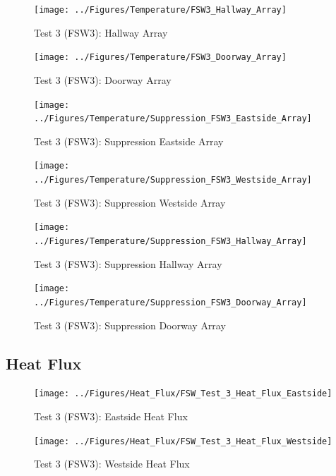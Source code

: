 \documentclass[12pt,oneside]{book}
\begin{document}
\begin{figure}[!ht]
	\texttt{[image: ../Figures/Temperature/FSW3\_Hallway\_Array]}
	\caption{Test 3 (FSW3): Hallway Array}
	\label{fig:Test_3_Hallway_Array}
\end{figure}

\begin{figure}[!ht]
	\texttt{[image: ../Figures/Temperature/FSW3\_Doorway\_Array]}
	\caption{Test 3 (FSW3): Doorway Array}
	\label{fig:Test_3_Doorway_Array}
\end{figure}

\begin{figure}[!ht]
	\texttt{[image: ../Figures/Temperature/Suppression\_FSW3\_Eastside\_Array]}
	\caption{Test 3 (FSW3): Suppression Eastside Array}
	\label{fig:Test_3_Suppression_Eastside_Array}
\end{figure}

\begin{figure}[!ht]
	\texttt{[image: ../Figures/Temperature/Suppression\_FSW3\_Westside\_Array]}
	\caption{Test 3 (FSW3): Suppression Westside Array}
	\label{fig:Test_3_Suppression_Westside_Array}
\end{figure}

\begin{figure}[!ht]
	\texttt{[image: ../Figures/Temperature/Suppression\_FSW3\_Hallway\_Array]}
	\caption{Test 3 (FSW3): Suppression Hallway Array}
	\label{fig:Test_3_Suppression_Hallway_Array}
\end{figure}

\begin{figure}[!ht]
	\texttt{[image: ../Figures/Temperature/Suppression\_FSW3\_Doorway\_Array]}
	\caption{Test 3 (FSW3): Suppression Doorway Array}
	\label{fig:Test_3_Suppression_Doorway_Array}
\end{figure}

\subsection{Heat Flux}
\label{subsec:Heat_Flux}

\begin{figure}[!ht]
	\texttt{[image: ../Figures/Heat\_Flux/FSW\_Test\_3\_Heat\_Flux\_Eastside]}
	\caption{Test 3 (FSW3): Eastside Heat Flux}
	\label{fig:Test_3_Eastside_Heat_Flux}
\end{figure}

\begin{figure}[!ht]
	\texttt{[image: ../Figures/Heat\_Flux/FSW\_Test\_3\_Heat\_Flux\_Westside]}
	\caption{Test 3 (FSW3): Westside Heat Flux}
	\label{fig:Test_3_Westside_Heat_Flux}
\end{figure}
\end{document}
